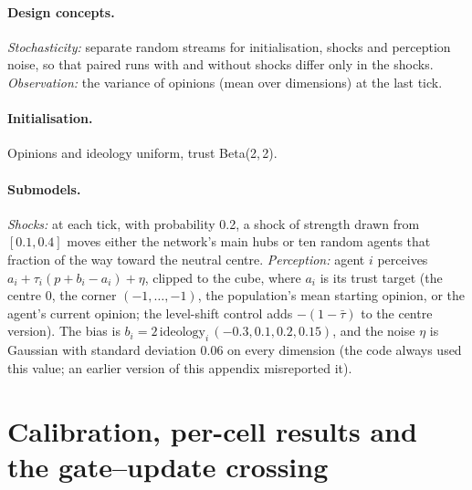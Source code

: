 \documentclass[11pt]{article}
\begin{document}
\paragraph{Design concepts.} \emph{Stochasticity:} separate random streams for initialisation, shocks and perception noise, so that paired runs with and without shocks differ only in the shocks. \emph{Observation:} the variance of opinions (mean over dimensions) at the last tick.

\paragraph{Initialisation.} Opinions and ideology uniform, trust Beta(2,\,2).

\paragraph{Submodels.} \emph{Shocks:} at each tick, with probability 0.2, a shock of strength drawn from $[0.1,0.4]$ moves either the network's main hubs or ten random agents that fraction of the way toward the neutral centre. \emph{Perception:} agent $i$ perceives $a_i + \tau_i(p + b_i - a_i) + \eta$, clipped to the cube, where $a_i$ is its trust target (the centre $0$, the corner $(-1,\dots,-1)$, the population's mean starting opinion, or the agent's current opinion; the level-shift control adds $-(1-\bar\tau)$ to the centre version). The bias is $b_i = 2\,\text{ideology}_i\,(-0.3, 0.1, 0.2, 0.15)$, and the noise $\eta$ is Gaussian with standard deviation 0.06 on every dimension (the code always used this value; an earlier version of this appendix misreported it).

\section{Calibration, per-cell results and the gate--update crossing}
\label{app:tables}

\begin{table}[h]
\centering\scriptsize
\caption{Run-matched thresholds: the $\varepsilon$ found by bisection (3 significant figures), its pass-rate error against the Euclidean target on the 50 pilot seeds, the number of bisection steps, and the pass-rate gap to Euclidean on the 100 evaluation seeds with a paired bootstrap 95\% interval; $^\dagger$ marks a gap not equivalent to zero ($\pm0.02$) and $^\ddagger$ a gap larger than the pilot tolerance ($0.005$) and $^\S$ a pilot error at the tolerance.}
\label{tab:calibration}

\end{table}
\end{document}

